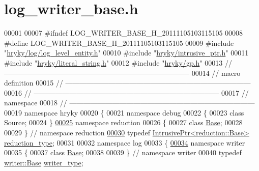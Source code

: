 \hypertarget{log__writer__base_8h_source}{\section{log\-\_\-writer\-\_\-base.\-h}
}

\begin{DoxyCode}
00001 
00007 \textcolor{preprocessor}{#ifndef LOG\_WRITER\_BASE\_H\_20111105103115105}
00008 \textcolor{preprocessor}{}\textcolor{preprocessor}{#define LOG\_WRITER\_BASE\_H\_20111105103115105}
00009 \textcolor{preprocessor}{}\textcolor{preprocessor}{#include "\hyperlink{log__level__entity_8h}{hryky/log/log_level_entity.h}"}
00010 \textcolor{preprocessor}{#include "\hyperlink{intrusive__ptr_8h}{hryky/intrusive_ptr.h}"}
00011 \textcolor{preprocessor}{#include "\hyperlink{literal__string_8h}{hryky/literal_string.h}"}
00012 \textcolor{preprocessor}{#include "\hyperlink{gp_8h}{hryky/gp.h}"}
00013 \textcolor{comment}{//
      ------------------------------------------------------------------------------}
00014 \textcolor{comment}{// macro definition}
00015 \textcolor{comment}{//
      ------------------------------------------------------------------------------}
00016 \textcolor{comment}{//
      ------------------------------------------------------------------------------}
00017 \textcolor{comment}{// namespace}
00018 \textcolor{comment}{//
      ------------------------------------------------------------------------------}
00019 \textcolor{keyword}{namespace }hryky
00020 \{
00021 \textcolor{keyword}{namespace }debug
00022 \{
00023     \textcolor{keyword}{class }Source;
00024 \}
\hypertarget{log__writer__base_8h_source_l00025}{}\hyperlink{namespacehryky_1_1reduction}{00025} \textcolor{keyword}{namespace }reduction
00026 \{
00027     \textcolor{keyword}{class }\hyperlink{classhryky_1_1reduction_1_1_base}{Base};
00028     
00029 \} \textcolor{comment}{// namespace reduction}
\hypertarget{log__writer__base_8h_source_l00030}{}\hyperlink{namespacehryky_a343a9a4c36a586be5c2693156200eadc}{00030} \textcolor{keyword}{typedef} \hyperlink{classhryky_1_1_intrusive_ptr}{IntrusivePtr<reduction::Base>}  \hyperlink{namespacehryky_a343a9a4c36a586be5c2693156200eadc}{reduction_type};
00031 
00032 \textcolor{keyword}{namespace }log
00033 \{
\hypertarget{log__writer__base_8h_source_l00034}{}\hyperlink{namespacehryky_1_1log_1_1writer}{00034} \textcolor{keyword}{namespace }writer
00035 \{
00037     \textcolor{keyword}{class }\hyperlink{classhryky_1_1log_1_1writer_1_1_base}{Base};
00038     
00039 \} \textcolor{comment}{// namespace writer}
00040 \textcolor{keyword}{typedef} \hyperlink{classhryky_1_1log_1_1writer_1_1_base}{writer::Base} \hyperlink{classhryky_1_1log_1_1writer_1_1_base}{writer_type};

\end{DoxyCode}

